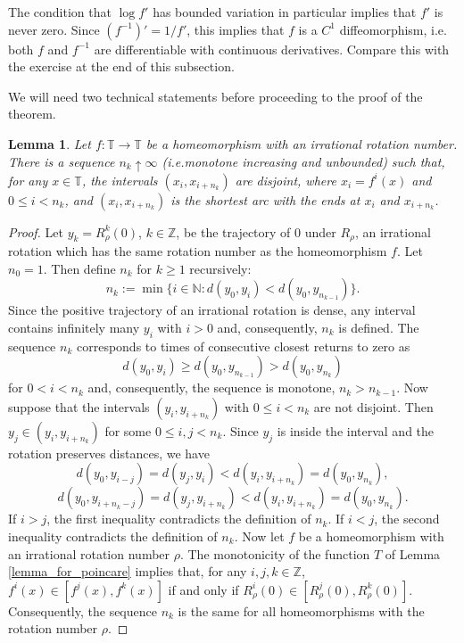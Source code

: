 \documentclass[12pt]{article}
\newtheorem{lemma}[theorem]{Lemma}
\theoremstyle{definition}
\theoremstyle{remark}
\begin{document}
\noindent
The condition that $\log f'$ has bounded variation in particular implies that 
$f'$ is never zero. Since $(f^{-1})' = 1/f'$, this implies that $f$ is a $C^1$ diffeomorphism, i.e.
both $f$ and $f^{-1}$ are differentiable with continuous derivatives. Compare this with the exercise at the end of this subsection.

\medskip
We will need two technical statements before proceeding to the proof of
the theorem.

\begin{lemma} \label{lemma_for_denjoy1}
Let $f : \mathbb T \to \mathbb T$ be a homeomorphism with an irrational rotation
number. There is a sequence $n_k \uparrow \infty$ (i.e.monotone increasing and unbounded)
such that, for any $x \in \mathbb T$, the intervals $(x_i, x_{i+n_k} )$ are disjoint, where $x_i = f^i(x)$
and $0 \le i < n_k$, and $(x_i, x_{i+n_k} )$ is the shortest arc with the ends at $x_i$ and
$x_{i+n_k}$.
\end{lemma}

\begin{proof}
Let $y_k = R_\rho^k(0)$, $k \in \mathbb Z$, be the trajectory of $0$ under $R_\rho$, an
irrational rotation which has the same rotation number as the homeomorphism
$f$.
Let $n_0 = 1$. Then define $n_k$ for $k \ge 1$ recursively:
\[
n_k := \min\{ i \in \mathbb N : d(y_0, y_i) < d(y_0, y_{n_{k-1}}) \}.
\]
Since the positive trajectory of an irrational rotation is dense, any interval
contains infinitely many $y_i$ with $i > 0$ and, consequently, $n_k$ is defined. The
sequence $n_k$ corresponds to times of consecutive closest returns to zero as
\[
d(y_0, y_i) \ge d(y_0, y_{n_{k-1}}) > d(y_0, y_{n_k} )
\]
for $0 < i < n_k$ and, consequently, the sequence is monotone, $n_k > n_{k-1}$.
Now suppose that the intervals $(y_i, y_{i+n_k})$ with $0 \le i < n_k$ are not
disjoint. Then $y_j \in (y_i, y_{i+n_k} )$ for some $0 \le i, j < n_k$. Since $y_j$ is inside the
interval and the rotation preserves distances, we have
\[
d(y_0, y_{i-j}) = d(y_j, y_i) < d(y_i, y_{i+n_k}) = d(y_0, y_{n_k} ),
\]
\[
d(y_0, y_{i+n_{k}-j}) = d(y_j, y_{i+n_k} ) < d(y_i, y_{i+n_k}) = d(y_0, y_{n_k} ).
\]
If $i > j$, the first inequality contradicts the definition of $n_k$. If $i < j$, the
second inequality contradicts the definition of $n_k$.
Now let $f$ be a homeomorphism with an irrational rotation number
$\rho$. The monotonicity of the function $T$ of Lemma \ref{lemma_for_poincare} implies that, for any
$i, j, k \in \mathbb Z$, $f^i(x) \in  [f^j(x), f^k(x)]$ if and only if $R_\rho^i(0) \in [R_\rho^j(0),R_\rho^k(0)]$.
Consequently, the sequence $n_k$ is the same for all homeomorphisms with the
rotation number $\rho$.
\end{proof}
\end{document}
